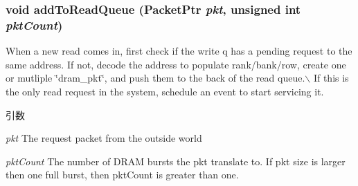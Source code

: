 \hypertarget{classDRAMCtrl_ac224a72395d7f9bea08435f4aee435df}{
\subsubsection[{addToReadQueue}]{\setlength{\rightskip}{0pt plus 5cm}void addToReadQueue ({\bf PacketPtr} {\em pkt}, \/  unsigned int {\em pktCount})}}
\label{classDRAMCtrl_ac224a72395d7f9bea08435f4aee435df}
When a new read comes in, first check if the write q has a pending request to the same address. If not, decode the address to populate rank/bank/row, create one or mutliple \char`\"{}dram\_\-pkt\char`\"{}, and push them to the back of the read queue.$\backslash$ If this is the only read request in the system, schedule an event to start servicing it.


\begin{DoxyParams}{引数}
\item[{\em pkt}]The request packet from the outside world \item[{\em pktCount}]The number of DRAM bursts the pkt translate to. If pkt size is larger then one full burst, then pktCount is greater than one. \end{DoxyParams}



